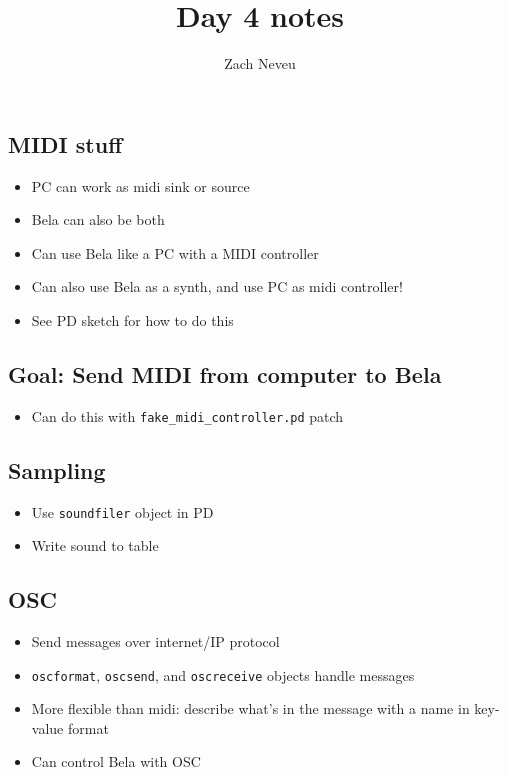 \documentclass[12pt, letter]{article}
\author{Zach Neveu}
\title{ Day 4 notes }
\begin{document}
\maketitle

\subsection*{MIDI stuff}
\begin{itemize}
	\item PC can work as midi sink or source
	\item Bela can also be both
	\item Can use Bela like a PC with a MIDI controller
	\item Can also use Bela as a synth, and use PC as midi controller!
	\item See PD sketch for how to do this
\end{itemize}

\subsection*{Goal: Send MIDI from computer to Bela}
\begin{itemize}
	\item Can do this with \texttt{fake\_midi\_controller.pd} patch
\end{itemize}

\subsection*{Sampling}
\begin{itemize}
	\item Use \texttt{soundfiler} object in PD
	\item Write sound to table
\end{itemize}

\subsection*{OSC}
\begin{itemize}
	\item Send messages over internet/IP protocol
	\item \texttt{oscformat}, \texttt{oscsend}, and \texttt{oscreceive} objects handle messages
	\item More flexible than midi: describe what's in the message with a name in key-value format
	\item Can control Bela with OSC
\end{itemize}
\end{document}
